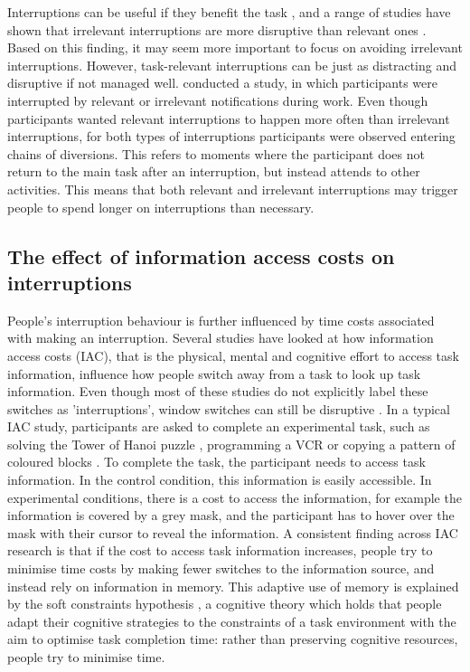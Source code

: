 Interruptions can be useful if they benefit the task \citep{Jin2009}, and a range of studies have shown that irrelevant interruptions are more disruptive than relevant ones \citep{Adamczyk2004, Gould2013a}. Based on this finding, it may seem more important to focus on avoiding irrelevant interruptions. However, task-relevant interruptions can be just as distracting and disruptive if not managed well. \citet{Iqbal2008} conducted a study, in which participants were interrupted by relevant or irrelevant notifications during work. Even though participants wanted relevant interruptions to happen more often than irrelevant interruptions, for both types of interruptions participants were observed entering chains of diversions. This refers to moments where the participant does not return to the main task after an interruption, but instead attends to other activities. This means that both relevant and irrelevant interruptions may trigger people to spend longer on interruptions than necessary.

\subsection{The effect of information access costs on interruptions}
People’s interruption behaviour is further influenced by time costs associated with making an interruption. Several studies have looked at how information access costs (IAC), that is the physical, mental and cognitive effort to access task information, influence how people switch away from a task to look up task information. Even though most of these studies do not explicitly label these switches as 'interruptions', window switches can still be disruptive \citep{Rule2013}. In a typical IAC study, participants are asked to complete an experimental task, such as solving the Tower of Hanoi puzzle \citep{Waldron2007}, programming a VCR \citep{Gray2004} or copying a pattern of coloured blocks \citep{Gray2006}. To complete the task, the participant needs to access task information. In the control condition, this information is easily accessible. In experimental conditions, there is a cost to access the information, for example the information is covered by a grey mask, and the participant has to hover over the mask with their cursor to reveal the information. A consistent finding across IAC research is that if the cost to access task information increases, people try to minimise time costs by making fewer switches to the information source, and instead rely on information in memory. This adaptive use of memory is explained by the soft constraints hypothesis \citep{Gray2006}, a cognitive theory which holds that people adapt their cognitive strategies to the constraints of a task environment with the aim to optimise task completion time: rather than preserving cognitive resources, people try to minimise time.

